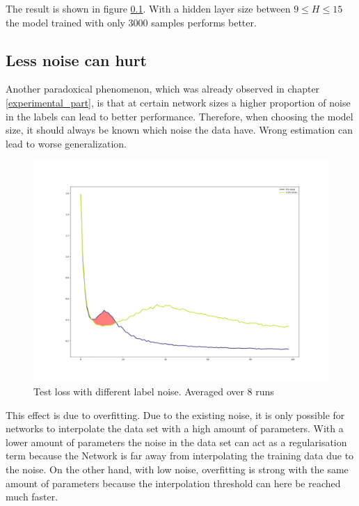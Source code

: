 The result is shown in figure \ref{less_noise_can_hurt}. With a hidden layer size between $9 \leq H \leq 15$ the model trained with only 3000 samples performs better. 

\subsection{Less noise can hurt}
\label{less_noise_can_hurt}
Another paradoxical phenomenon, which was already observed in chapter \ref{experimental_part}, is that at certain network sizes a higher proportion of noise in the labels can lead to better performance. Therefore, when choosing the model size, it should always be known which noise the data have. Wrong estimation can lead to worse generalization.

\begin{figure}[!htp]
\centering
\includegraphics[width= 1\linewidth]{Abschlussarbeit_2021/LaTeX/images/more_noise_hurt.png}
\caption{ Test loss with different label noise. Averaged over 8 runs }
\label{more_noise_can_hurt}
\end{figure}

This effect is due to overfitting. Due to the existing noise, it is only possible for networks to interpolate the data set with a high amount of parameters. With a lower amount of parameters the noise in the data set can act as a regularisation term because the Network is far away from interpolating the training data due to the noise. On the other hand, with low noise, overfitting is strong with the same amount of parameters because the interpolation threshold can here be reached much faster.

